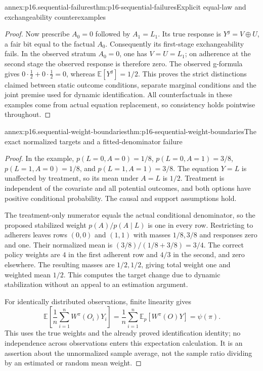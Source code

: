 \begin{annexitem}{annex:p16.sequential-failures}{thm:p16-sequential-failures}{Explicit equal-law and exchangeability counterexamples}
\begin{proof}
Now prescribe \(A_0=0\) followed by \(A_1=L_1\). Its true response
is \(Y^g=V\oplus U\), a fair bit equal to the factual \(A_0\).
Consequently its first-stage exchangeability fails. In the observed
stratum \(A_0=0\), one has \(V=U=L_1\); on adherence at the second
stage the observed response is therefore zero. The observed g-formula
gives \(0\cdot\frac12+0\cdot\frac12=0\), whereas
\(\mathbb E[Y^g]=1/2\). This proves the strict distinctions claimed
between static outcome conditions, separate marginal conditions and
the joint premise used for dynamic identification. All counterfactuals
in these examples come from actual equation replacement, so consistency
holds pointwise throughout.
\end{proof}
\end{annexitem}

\begin{annexitem}{annex:p16.sequential-weight-boundaries}{thm:p16-sequential-weight-boundaries}{The exact normalized targets and a fitted-denominator failure}
\begin{proof}
In the example, \(p(L=0,A=0)=1/8\),
\(p(L=0,A=1)=3/8\), \(p(L=1,A=0)=1/8\), and
\(p(L=1,A=1)=3/8\). The equation \(Y=L\) is unaffected by treatment,
so its mean under \(A=L\) is \(1/2\). Treatment is independent of
the covariate and all potential outcomes, and both options have positive
conditional probability. The causal and support assumptions hold.

The treatment-only numerator equals the actual conditional denominator,
so the proposed stabilized weight \(p(A)/p(A\mid L)\) is one in every
row. Restricting to adherers leaves rows \((0,0)\) and \((1,1)\)
with masses \(1/8,3/8\) and responses zero and one. Their normalized
mean is \((3/8)/(1/8+3/8)=3/4\). The correct policy weights are
\(4\) in the first adherent row and \(4/3\) in the second, and zero
elsewhere. The resulting masses are \(1/2,1/2\), giving total weight
one and weighted mean \(1/2\). This computes the target change due
to dynamic stabilization without an appeal to an estimation argument.

For identically distributed observations, finite linearity gives
\[
 \mathbb E\left[\frac1n\sum_{i=1}^nW^\pi(O_i)Y_i\right]
 =\frac1n\sum_{i=1}^n\mathbb E_p[W^\pi(O)Y]
 =\psi(\pi).
\]
This uses the true weights and the already proved identification identity;
no independence across observations enters this expectation calculation.
It is an assertion about the unnormalized sample average, not the sample
ratio dividing by an estimated or random mean weight.


\end{proof}
\end{annexitem}
